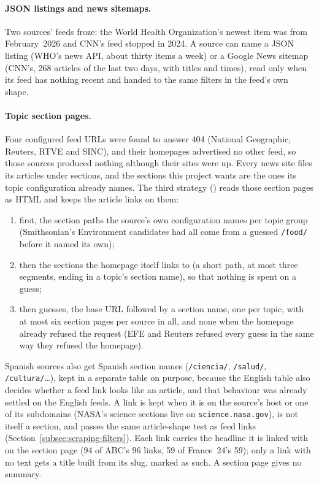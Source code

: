 \paragraph{JSON listings and news sitemaps.} Two sources' feeds froze:
the World Health Organization's newest item was from February~2026 and
CNN's feed stopped in 2024. A source can name a JSON listing (WHO's news
API, about thirty items a week) or a Google News sitemap (CNN's, 268
articles of the last two days, with titles and times), read only when
its feed has nothing recent and handed to the same filters in the
feed's own shape.

\paragraph{Topic section pages.} Four configured feed URLs were found
to answer 404 (National Geographic, Reuters, RTVE and SINC), and their
homepages advertised no other feed, so those sources produced nothing
although their sites were up. Every news site files its articles under
sections, and the sections this project wants are the ones its topic
configuration already names. The third strategy
() reads those section pages as HTML
and keeps the article links on them:

\begin{enumerate}
    \item first, the section paths the source's own configuration names
    per topic group (Smithsonian's Environment candidates had all come
    from a guessed \texttt{/food/} before it named its own);
    \item then the sections the homepage itself links to (a short
    path, at most three segments, ending in a topic's section name), so
    that nothing is spent on a guess;
    \item then guesses, the base URL followed by a section name, one per
    topic, with at most six section pages per source in all, and none
    when the homepage already refused the request (EFE and Reuters
    refused every guess in the same way they refused the homepage).
\end{enumerate}

Spanish sources also get Spanish section names (\texttt{/ciencia/},
\texttt{/salud/}, \texttt{/cultura/}\ldots), kept in a separate table on
purpose, because the English table also decides whether a feed link
looks like an article, and that behaviour was already settled on the
English feeds. A link is kept when it is on the source's host or one
of its subdomains (NASA's science sections live on
\texttt{science.nasa.gov}), is not itself a section, and passes the
same article-shape test as feed links
(Section~\ref{subsec:scraping-filters}). Each link carries the headline
it is linked with on the section page (94 of ABC's 96 links, 59 of
France~24's 59); only a link with no text gets a title built from its
slug, marked as such. A section page gives no summary.

